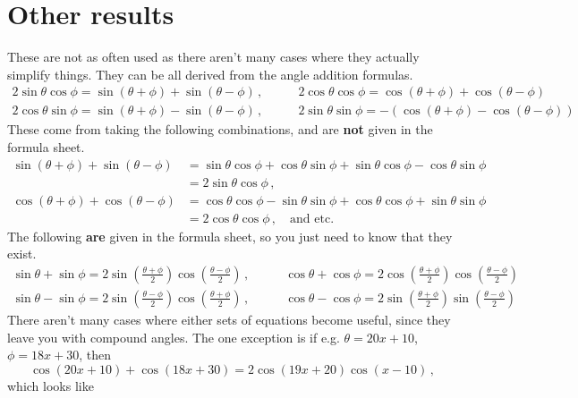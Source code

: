 \documentclass{article}
\begin{document}
\section{Other results}
These are not as often used as there aren't many cases where they actually simplify things. They can be all derived from the angle addition formulas. 
\begin{align}
    2\sin\theta\cos\phi = \sin(\theta+\phi) + \sin(\theta-\phi)\,,&\qquad 2\cos\theta\cos\phi = \cos(\theta+\phi) + \cos(\theta-\phi)\\
    2\cos\theta\sin\phi = \sin(\theta+\phi)-\sin(\theta-\phi)\,,&\qquad 2\sin\theta\sin\phi = -(\cos(\theta+\phi)-\cos(\theta-\phi))
\end{align}
These come from taking the following combinations, and are \textbf{not} given in the formula sheet.
\begin{align*}
    \sin(\theta+\phi) + \sin(\theta-\phi)&=\sin\theta\cos\phi+\cos\theta\sin\phi+\sin\theta\cos\phi-\cos\theta\sin\phi\\
    &=2\sin\theta\cos\phi\,,\\
    \cos(\theta+\phi)+\cos(\theta-\phi)&=\cos\theta\cos\phi -\sin\theta\sin\phi + \cos\theta\cos\phi+\sin\theta\sin\phi\\
    &= 2\cos\theta\cos\phi\,,\quad\text{and etc.}
\end{align*}
The following \textbf{are} given in the formula sheet, so you just need to know that they exist.
\begin{align}
    \sin\theta+\sin\phi=2\sin\left(\frac{\theta+\phi}{2}\right)\cos\left(\frac{\theta-\phi}{2}\right)\,,&\qquad\cos\theta+\cos\phi = 2\cos\left(\frac{\theta+\phi}{2}\right)\cos\left(\frac{\theta-\phi}{2}\right)\\
    \sin\theta-\sin\phi=2\sin\left(\frac{\theta-\phi}{2}\right)\cos\left(\frac{\theta+\phi}{2}\right)\,,&\qquad\cos\theta-\cos\phi=2\sin\left(\frac{\theta+\phi}{2}\right)\sin\left(\frac{\theta-\phi}{2}\right)
\end{align}
There aren't many cases where either sets of equations become useful, since they leave you with compound angles. The one exception is if e.g. $\theta=20x+10$, $\phi=18x+30$, then
\[
\cos(20x+10)+\cos(18x+30)=2\cos(19x+20)\cos(x-10)\,,
\]
which looks like
\begin{figure}[H]
    \centering
\end{figure}
\end{document}
